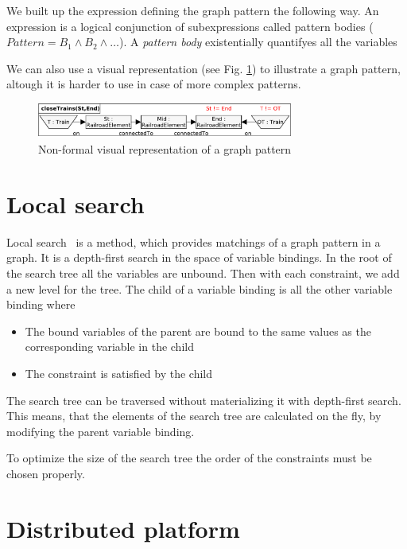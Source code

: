 We built up the expression defining the graph pattern the following way. 
An expression is a logical conjunction of subexpressions called pattern bodies ($Pattern = B_1 \wedge B_2 \wedge \dots$). 
A \emph{pattern body} existentially quantifyes all the variables 


We can also use a visual representation (see Fig. \ref{fig:pattern-visual}) to illustrate a graph pattern, altough it is harder to use in case of more complex patterns.

\begin{figure}[h]
	\begin{center}
		\includegraphics[width=0.75\textwidth]{figures/pattern-visual.pdf}
		\caption{Non-formal visual representation of a graph pattern}
		\label{fig:pattern-visual}
	\end{center}
\end{figure}


\section{Local search}

Local search~\cite{bur-marton-msc} is a method, which provides matchings of a graph pattern in a graph. It is a depth-first search in the space of variable bindings. In the root of the search tree all the variables are unbound. Then with each constraint, we add a new level for the tree. The child of a variable binding is all the other variable binding where 
\begin{itemize}
	\item The bound variables of the parent are bound to the same values as the corresponding variable in the child
	\item The constraint is satisfied by the child
\end{itemize}

The search tree can be traversed without materializing it with depth-first search. This means, that the elements of the search tree are calculated on the fly, by modifying the parent variable binding.

To optimize the size of the search tree the order of the constraints must be chosen properly. 

\section{Distributed platform}

